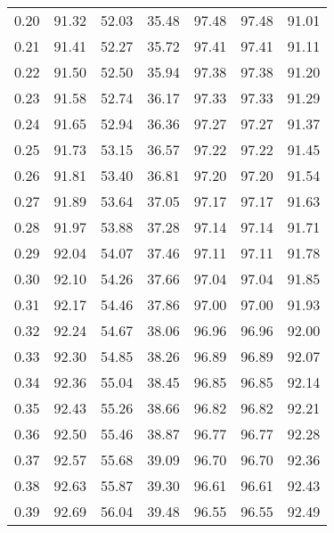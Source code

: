 \begin{tabular}{|c|c|c|c|c|c|c|}
      0.20 &     91.32 &     52.03 &      35.48 &   97.48 &      97.48 &         91.01 \\
      0.21 &     91.41 &     52.27 &      35.72 &   97.41 &      97.41 &         91.11 \\
      0.22 &     91.50 &     52.50 &      35.94 &   97.38 &      97.38 &         91.20 \\
      0.23 &     91.58 &     52.74 &      36.17 &   97.33 &      97.33 &         91.29 \\
      0.24 &     91.65 &     52.94 &      36.36 &   97.27 &      97.27 &         91.37 \\
      0.25 &     91.73 &     53.15 &      36.57 &   97.22 &      97.22 &         91.45 \\
      0.26 &     91.81 &     53.40 &      36.81 &   97.20 &      97.20 &         91.54 \\
      0.27 &     91.89 &     53.64 &      37.05 &   97.17 &      97.17 &         91.63 \\
      0.28 &     91.97 &     53.88 &      37.28 &   97.14 &      97.14 &         91.71 \\
      0.29 &     92.04 &     54.07 &      37.46 &   97.11 &      97.11 &         91.78 \\
      0.30 &     92.10 &     54.26 &      37.66 &   97.04 &      97.04 &         91.85 \\
      0.31 &     92.17 &     54.46 &      37.86 &   97.00 &      97.00 &         91.93 \\
      0.32 &     92.24 &     54.67 &      38.06 &   96.96 &      96.96 &         92.00 \\
      0.33 &     92.30 &     54.85 &      38.26 &   96.89 &      96.89 &         92.07 \\
      0.34 &     92.36 &     55.04 &      38.45 &   96.85 &      96.85 &         92.14 \\
      0.35 &     92.43 &     55.26 &      38.66 &   96.82 &      96.82 &         92.21 \\
      0.36 &     92.50 &     55.46 &      38.87 &   96.77 &      96.77 &         92.28 \\
      0.37 &     92.57 &     55.68 &      39.09 &   96.70 &      96.70 &         92.36 \\
      0.38 &     92.63 &     55.87 &      39.30 &   96.61 &      96.61 &         92.43 \\
      0.39 &     92.69 &     56.04 &      39.48 &   96.55 &      96.55 &         92.49 \\

\end{tabular}
